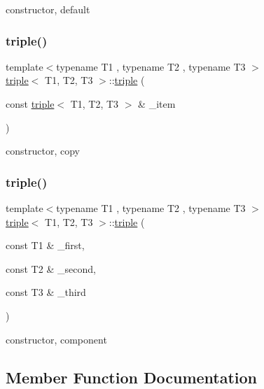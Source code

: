 constructor, default 

\mbox{\label{structtriple_a88688d689a93bf4b8a25bc29728a53b5}} 
\subsubsection{\texorpdfstring{triple()}{triple()}\hspace{0.1cm}{\footnotesize\ttfamily [2/3]}}
{\footnotesize\ttfamily template$<$typename T1 , typename T2 , typename T3 $>$ \\
\hyperlink{structtriple}{triple}$<$ T1, T2, T3 $>$\+::\hyperlink{structtriple}{triple} (\begin{DoxyParamCaption}\item[{const \hyperlink{structtriple}{triple}$<$ T1, T2, T3 $>$ \&}]{\+\_\+item }\end{DoxyParamCaption})\hspace{0.3cm}{\ttfamily [inline]}}



constructor, copy 

\mbox{\label{structtriple_ac34fdb8619fdc11fb442e2058d35d840}} 
\subsubsection{\texorpdfstring{triple()}{triple()}\hspace{0.1cm}{\footnotesize\ttfamily [3/3]}}
{\footnotesize\ttfamily template$<$typename T1 , typename T2 , typename T3 $>$ \\
\hyperlink{structtriple}{triple}$<$ T1, T2, T3 $>$\+::\hyperlink{structtriple}{triple} (\begin{DoxyParamCaption}\item[{const T1 \&}]{\+\_\+first,  }\item[{const T2 \&}]{\+\_\+second,  }\item[{const T3 \&}]{\+\_\+third }\end{DoxyParamCaption})\hspace{0.3cm}{\ttfamily [inline]}}



constructor, component 



\subsection{Member Function Documentation}
\mbox{\label{structtriple_a73d954bee19bf6493205e794a6448e8f}} 
